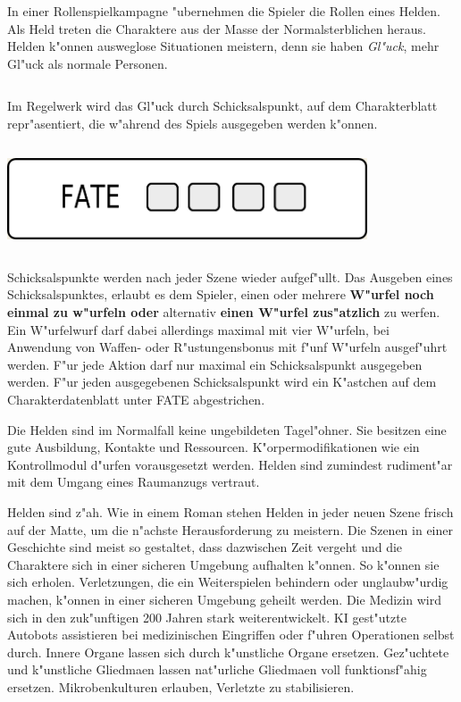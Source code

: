
In einer Rollenspielkampagne "ubernehmen die Spieler die Rollen eines Helden. Als Held treten die Charaktere aus der Masse der Normalsterblichen heraus. Helden k"onnen ausweglose Situationen meistern, denn sie haben \emph{Gl"uck}, mehr Gl"uck als normale Personen. 

\begin{column}[l]{0.52}
    Im Regelwerk wird das Gl"uck durch Schicksalspunkt,  auf dem Charakterblatt repr"asentiert, die w"ahrend des Spiels ausgegeben werden k"onnen.
\end{column}
\begin{column}[r]{0.48}
    \centering
    \includegraphics[width=0.80\textwidth]{images/character_fate.jpg}    
\end{column}

Schicksalspunkte werden nach jeder Szene wieder aufgef"ullt. Das Ausgeben eines Schicksalspunktes, erlaubt es dem Spieler, einen oder mehrere \textbf{W"urfel noch einmal zu w"urfeln oder} alternativ \textbf{einen W"urfel zus"atzlich} zu werfen. Ein W"urfelwurf darf dabei allerdings maximal mit vier W"urfeln, bei Anwendung von Waffen- oder R"ustungensbonus mit f"unf W"urfeln ausgef"uhrt werden. F"ur jede Aktion darf nur maximal ein Schicksalspunkt ausgegeben werden. F"ur jeden ausgegebenen Schicksalspunkt wird ein K"astchen auf dem Charakterdatenblatt unter FATE abgestrichen.

Die Helden sind im Normalfall keine ungebildeten Tagel"ohner. Sie besitzen eine gute Ausbildung, Kontakte und Ressourcen. K"orpermodifikationen wie ein Kontrollmodul d"urfen vorausgesetzt werden. Helden sind zumindest rudiment"ar mit dem Umgang eines Raumanzugs vertraut.

Helden sind z"ah. Wie in einem Roman stehen Helden in jeder neuen Szene frisch auf der Matte, um die n"achste Herausforderung zu meistern. Die Szenen in einer Geschichte sind meist so gestaltet, dass dazwischen Zeit vergeht und die Charaktere sich in einer sicheren Umgebung aufhalten k"onnen. So k"onnen sie sich erholen. Verletzungen, die ein Weiterspielen behindern oder unglaubw"urdig machen, k"onnen in einer sicheren Umgebung geheilt werden. Die Medizin wird sich in den zuk"unftigen 200 Jahren stark weiterentwickelt. KI gest"utzte Autobots assistieren bei medizinischen Eingriffen oder f"uhren Operationen selbst durch. Innere Organe lassen sich durch k"unstliche Organe ersetzen. Gez"uchtete und k"unstliche Gliedma\3en lassen nat"urliche Gliedma\3en voll funktionsf"ahig ersetzen. Mikrobenkulturen erlauben, Verletzte zu stabilisieren.
